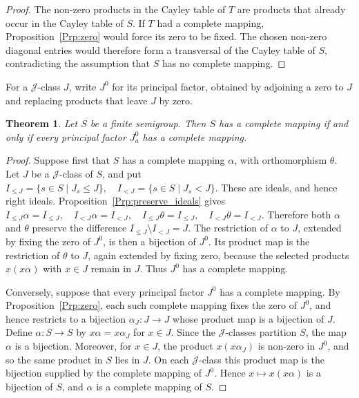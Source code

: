 \documentclass[11pt]{article}
\theoremstyle{plain}
\newtheorem{theorem}{Theorem}[section]
\theoremstyle{remark}
\theoremstyle{definition}
\theoremstyle{plain}
\begin{document}
\begin{proof}
The non-zero products in the Cayley table of $T$ are products that already occur in the Cayley table of $S$. If $T$ had a complete mapping, Proposition~\ref{Prp:zero} would force its zero to be fixed. The chosen non-zero diagonal entries would therefore form a transversal of the Cayley table of $S$, contradicting the assumption that $S$ has no complete mapping.
\end{proof}

For a $\mathcal J$-class $J$, write $J^0$ for its principal factor, obtained by adjoining a zero to $J$ and replacing products that leave $J$ by zero.

\begin{theorem}\label{t:J-reduct}
Let $S$ be a finite semigroup. Then $S$ has a complete mapping if and only if every principal factor $J_a^0$ has a complete mapping.
\end{theorem}

\begin{proof}
Suppose first that $S$ has a complete mapping $\alpha$, with orthomorphism $\theta$. Let $J$ be a $\mathcal J$-class of $S$, and put
\(I_{\le J}=\{s\in S\mid J_s\le J\},\quad I_{<J}=\{s\in S\mid J_s<J\}.\)
These are ideals, and hence right ideals. Proposition~\ref{Prp:preserve_ideals} gives
\(I_{\le J}\alpha=I_{\le J},\quad I_{<J}\alpha=I_{<J},\quad I_{\le J}\theta=I_{\le J},\quad I_{<J}\theta=I_{<J}.\)
Therefore both $\alpha$ and $\theta$ preserve the difference
\(I_{\le J}\setminus I_{<J}=J.\)
The restriction of $\alpha$ to $J$, extended by fixing the zero of $J^0$, is then a bijection of $J^0$. Its product map is the restriction of $\theta$ to $J$, again extended by fixing zero, because the selected products $x(x\alpha)$ with $x\in J$ remain in $J$. Thus $J^0$ has a complete mapping.

Conversely, suppose that every principal factor $J^0$ has a complete mapping. By Proposition~\ref{Prp:zero}, each such complete mapping fixes the zero of $J^0$, and hence restricts to a bijection $\alpha_J\colon J\to J$ whose product map is a bijection of $J$. Define $\alpha\colon S\to S$ by $x\alpha=x\alpha_J$ for $x\in J$. Since the $\mathcal J$-classes partition $S$, the map $\alpha$ is a bijection. Moreover, for $x\in J$, the product $x(x\alpha_J)$ is non-zero in $J^0$, and so the same product in $S$ lies in $J$. On each $\mathcal J$-class this product map is the bijection supplied by the complete mapping of $J^0$. Hence $x\mapsto x(x\alpha)$ is a bijection of $S$, and $\alpha$ is a complete mapping of $S$.
\end{proof}
\end{document}
